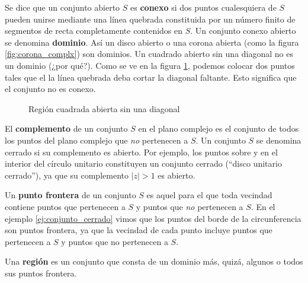 Se dice que un conjunto abierto $S$ es \textbf{conexo} si dos puntos cualesquiera de $S$ pueden unirse mediante una línea quebrada constituida por un número finito de segmentos de recta completamente contenidos en $S$. Un conjunto conexo abierto se denomina \textbf{dominio}. Así un disco abierto o una corona abierta (como la figura \ref{fig:corona_complx}) son dominios. Un cuadrado abierto sin una diagonal no es un dominio (¿por qué?). Como se ve en la figura \ref{fig:cuadrado_abierto}, podemos colocar dos puntos tales que el la línea quebrada deba cortar la diagonal faltante. Esto significa que el conjunto no es conexo.
\begin{figure}[ht]
  \centering
  \caption{Región cuadrada abierta sin una diagonal}
  \label{fig:cuadrado_abierto}
\end{figure}

El \textbf{complemento} de un conjunto $S$ en el plano complejo es el conjunto de todos los puntos del plano complejo que \textit{no} pertenecen a $S$. Un conjunto $S$ se denomina cerrado si su complemento es abierto. Por ejemplo, los puntos sobre y en el interior del círculo unitario constituyen un conjunto cerrado (``disco unitario cerrado''), ya que su complemento $\lvert z \rvert > 1$ es abierto.

Un \textbf{punto frontera} de un conjunto $S$ es aquel para el que toda vecindad contiene puntos que pertenecen a $S$ y puntos que \textit{no} pertenecen a $S$. En el ejemplo \ref{ej:conjunto_cerrado} vimos que los puntos del borde de la circunferencia son puntos frontera, ya que la vecindad de cada punto incluye puntos que pertenecen a $S$ y puntos que no pertenecen a $S$.

Una \textbf{región} es un conjunto que consta de un dominio más, quizá, algunos o todos sus puntos frontera. 
